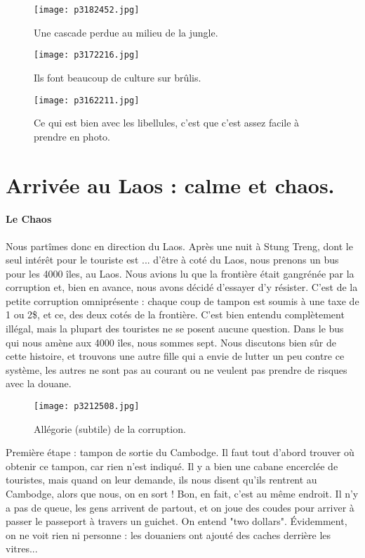 \documentclass{book}
\begin{document}
\begin{figure}[h]
\centering
\texttt{[image: p3182452.jpg]}
\caption*{Une cascade perdue au milieu de la jungle.}
\end{figure}


\begin{figure}[h]
\centering
\texttt{[image: p3172216.jpg]}
\caption*{Ils font beaucoup de culture sur brûlis.}
\end{figure}


\begin{figure}[h]
\centering
\texttt{[image: p3162211.jpg]}
\caption*{Ce qui est bien avec les libellules, c'est que c'est assez facile à prendre en photo.}
\end{figure}







\chapter{Arrivée au Laos : calme et chaos.}
\subsubsection{Le Chaos}
Nous partîmes donc en direction du Laos. Après une nuit à Stung Treng, dont le seul intérêt pour le touriste est ... d'être à coté du Laos, nous prenons un bus pour les 4000 îles, au Laos. Nous avions lu que la frontière était gangrénée par la corruption et, bien en avance, nous avons décidé d'essayer d'y résister. C'est de la petite corruption omniprésente : chaque coup de tampon est soumis à une taxe de 1 ou 2\$, et ce, des deux cotés de la frontière. C'est bien entendu complètement illégal, mais la plupart des touristes ne se posent aucune question. Dans le bus qui nous amène aux 4000 îles, nous sommes sept. Nous discutons bien sûr de cette histoire, et trouvons une autre fille qui a envie de lutter un peu contre ce système, les autres ne sont pas au courant ou ne veulent pas prendre de risques avec la douane.


\begin{figure}[h]
\centering
\texttt{[image: p3212508.jpg]}
\caption*{Allégorie (subtile) de la corruption.}
\end{figure}

Première étape : tampon de sortie du Cambodge. Il faut tout d'abord trouver où obtenir ce tampon, car rien n'est indiqué. Il y a bien une cabane encerclée de touristes, mais quand on leur demande, ils nous disent qu'ils rentrent au Cambodge, alors que nous, on en sort ! Bon, en fait, c'est au même endroit. Il n'y a pas de queue, les gens arrivent de partout, et on joue des coudes pour arriver à passer le passeport à travers un guichet. On entend "two dollars". Évidemment, on ne voit rien ni personne : les douaniers ont ajouté des caches derrière les vitres...
\end{document}
